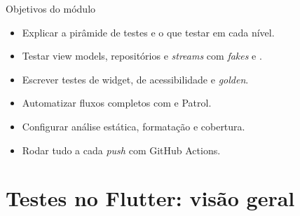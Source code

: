 \documentclass[aspectratio=169,10pt]{beamer}
\begin{document}
\capa

\begin{frame}{Objetivos do módulo}
  \begin{conceito}
    \begin{itemize}
      \item Explicar a pirâmide de testes e o que testar em cada nível.
      \item Testar view models, repositórios e \emph{streams} com \emph{fakes} e .
      \item Escrever testes de widget, de acessibilidade e \emph{golden}.
      \item Automatizar fluxos completos com  e Patrol.
      \item Configurar análise estática, formatação e cobertura.
      \item Rodar tudo a cada \emph{push} com GitHub Actions.
    \end{itemize}
  \end{conceito}
\end{frame}

\sumario



\section{Testes no Flutter: visão geral}
\end{document}
